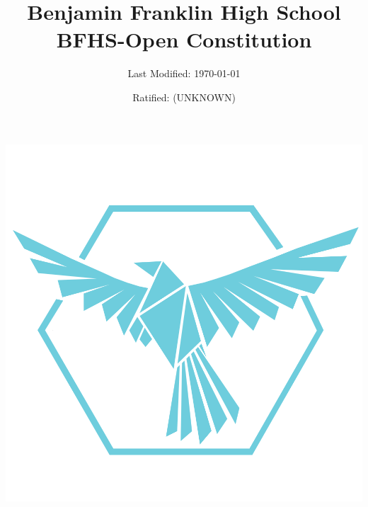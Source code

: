 \documentclass{article}
\title{Benjamin Franklin High School \\ BFHS-Open Constitution}
\date{Ratified: (UNKNOWN)}
\author{Last Modified: \today}
\newcommand{\inputarticle}[1]{\newpage~}
\begin{document}
	\maketitle
	\includegraphics[width=\textwidth]{./assets/logo.png}
	\newpage

	\tableofcontents

	\inputarticle{./articles/article-01.tex}
	\inputarticle{./articles/article-02.tex}
	\inputarticle{./articles/article-03.tex}
	\inputarticle{./articles/article-04.tex}
	\inputarticle{./articles/article-05.tex}
	\inputarticle{./articles/article-06.tex}
	\inputarticle{./articles/article-07.tex}
	\inputarticle{./articles/article-08.tex}
	\inputarticle{./articles/article-09.tex}
\end{document}
